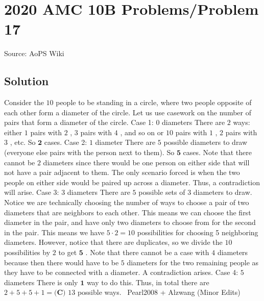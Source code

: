 \documentclass[12pt]{article}
\begin{document}
\section*{{2020 AMC 10B Problems/Problem 17}}
Source: AoPS Wiki

\subsection*{Solution}
Consider the $10$ people to be standing in a circle, where two people opposite of each other form a diameter of the circle. Let us use casework on the number of pairs that form a diameter of the circle. Case 1: $0$ diameters There are $2$ ways: either $1$ pairs with $2$ , $3$ pairs with $4$ , and so on or $10$ pairs with $1$ , $2$ pairs with $3$ , etc. So $\boxed{\textbf{2}}$ cases. Case 2: $1$ diameter There are $5$ possible diameters to draw (everyone else pairs with the person next to them). So $\boxed{\textbf{5}}$ cases. Note that there cannot be $2$ diameters since there would be one person on either side that will not have a pair adjacent to them. The only scenario forced is when the two people on either side would be paired up across a diameter. Thus, a contradiction will arise. Case 3: $3$ diameters There are $5$ possible sets of $3$ diameters to draw.
Notice we are technically choosing the number of ways to choose a pair of two diameters that are neighbors to each other. This means we can choose the first diameter in the pair, and have only two diameters to choose from for the second in the pair. This means we have $5 \cdot 2=10$ possibilities for choosing 5 neighboring diameters. However, notice that there are duplicates, so we divide the $10$ possibilities by $2$ to get $\boxed{\textbf{5}}$ . Note that there cannot be a case with $4$ diameters because then there would have to be $5$ diameters for the two remaining people as they have to be connected with a diameter. A contradiction arises. Case 4: $5$ diameters There is only $\boxed{\textbf{1}}$ way to do this. Thus, in total there are $2+5+5+1=\boxed{\textbf{(C) }13}$ possible ways. ~Pearl2008 + Alzwang (Minor Edits)
\end{document}
